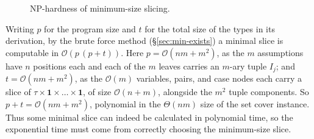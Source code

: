 \begin{figure}[t]
\caption{NP-hardness of minimum-size slicing.}
\label{fig:nphard}
\end{figure}

Writing $p$ for the program size and $t$ for the total size of the types in its derivation, by the brute force method (\S\ref{sec:min-exists}) a minimal slice is computable in $\mathcal{O}(p\,(p+t))$. Here $p = \mathcal{O}(nm + m^2)$, as the $m$ assumptions have $n$ positions each and each of the $m$ leaves carries an $m$-ary tuple $I_j$; and $t = \mathcal{O}(nm + m^2)$, as the $\mathcal{O}(m)$ variables, pairs, and case nodes each carry a slice of $\tau \times \mathbf{1} \times \dots \times \mathbf{1}$, of size $\mathcal{O}(n + m)$, alongside the $m^2$ tuple components. So $p + t = \mathcal{O}(nm + m^2)$, polynomial in the $\Theta(nm)$ size of the set cover instance. Thus some minimal slice can indeed be calculated in polynomial time, so the exponential time must come from correctly choosing the minimum-size slice.



